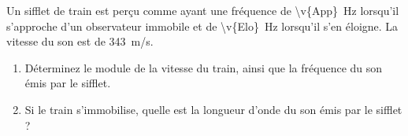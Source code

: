 Un sifflet de train est perçu comme ayant une fréquence de \qty{\v{App}}{Hz} lorsqu’il s’approche d’un observateur immobile et de \qty{\v{Elo}}{Hz} lorsqu’il s’en éloigne. La vitesse du son est de \qty{343}{m/s}.
\begin{enumerate}[label=\alph*)]
    \item Déterminez le module de la vitesse du train, ainsi que la fréquence du son émis par le sifflet.
    \item Si le train s’immobilise, quelle est la longueur d’onde du son émis par le sifflet ?
\end{enumerate}